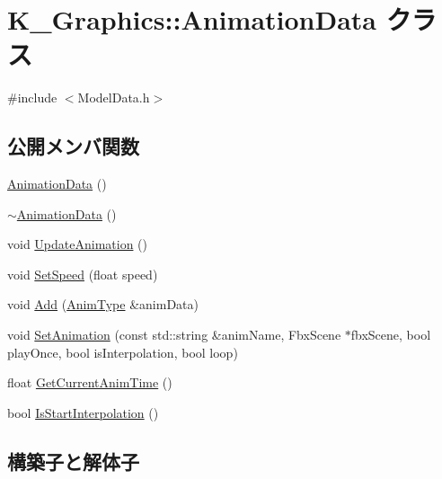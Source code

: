 \hypertarget{class_k___graphics_1_1_animation_data}{}\section{K\+\_\+\+Graphics\+:\+:Animation\+Data クラス}
\label{class_k___graphics_1_1_animation_data}


{\ttfamily \#include $<$Model\+Data.\+h$>$}

\subsection*{公開メンバ関数}
\begin{DoxyCompactItemize}
\item 
\mbox{\hyperlink{class_k___graphics_1_1_animation_data_a71e4f6d6b43f4d263d8f9c2ba0ac4b14}{Animation\+Data}} ()
\item 
\mbox{\hyperlink{class_k___graphics_1_1_animation_data_a8e3057f5c2f94c429cf4ced605996e86}{$\sim$\+Animation\+Data}} ()
\item 
void \mbox{\hyperlink{class_k___graphics_1_1_animation_data_ac21aed89fd93048943bfee6229ed5cef}{Update\+Animation}} ()
\item 
void \mbox{\hyperlink{class_k___graphics_1_1_animation_data_ab9e23e93b0ee89f4029a8ac2330aa6ac}{Set\+Speed}} (float speed)
\item 
void \mbox{\hyperlink{class_k___graphics_1_1_animation_data_a8ad4f43ef2a7b3ff262b8dbf17ed5bbb}{Add}} (\mbox{\hyperlink{struct_k___graphics_1_1_anim_type}{Anim\+Type}} \&anim\+Data)
\item 
void \mbox{\hyperlink{class_k___graphics_1_1_animation_data_a20cbd7c49a4fd78aa0e37500cc93281d}{Set\+Animation}} (const std\+::string \&anim\+Name, Fbx\+Scene $\ast$fbx\+Scene, bool play\+Once, bool is\+Interpolation, bool loop)
\item 
float \mbox{\hyperlink{class_k___graphics_1_1_animation_data_a009d03ca3c4f41be2e2fa136b4382c63}{Get\+Current\+Anim\+Time}} ()
\item 
bool \mbox{\hyperlink{class_k___graphics_1_1_animation_data_abeda0e313c21f5c6ec3f8c930c0f5ade}{Is\+Start\+Interpolation}} ()
\end{DoxyCompactItemize}


\subsection{構築子と解体子}
\mbox{\label{class_k___graphics_1_1_animation_data_a71e4f6d6b43f4d263d8f9c2ba0ac4b14}} 
